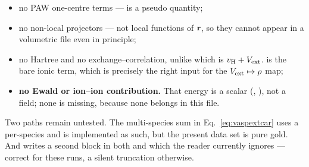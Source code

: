 \begin{itemize}
  \item no PAW one-centre terms ---  is a pseudo quantity;
  \item no non-local projectors --- not local functions of $\mathbf{r}$, so they
    cannot appear in a volumetric file even in principle;
  \item no Hartree and no exchange--correlation, unlike  which is
    $v_{\mathrm{H}}+V_{\mathrm{ext}}$.  is the bare ionic term, which is precisely the
    right input for the $V_{\mathrm{ext}}\mapsto\rho$ map;
  \item \textbf{no Ewald or ion--ion contribution.} That energy is a scalar
    (, ), not a field; none is missing, because none
    belongs in this file.
\end{itemize}

\begin{pwarn}
Two paths remain untested. The multi-species sum in Eq.~\eqref{eq:vaspextcar}
uses a per-species  and is implemented as such, but the present data
set is pure gold. And  writes a second block in both 
and  which the reader currently ignores --- correct for these
 runs, a silent truncation otherwise.
\end{pwarn}
